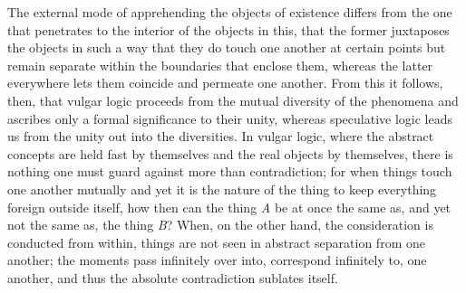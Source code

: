 \documentclass[12pt]{book}
\newcommand{\opage}[1]{\marginnote{\footnotesize\textit{[#1]}}}
\begin{document}
The external mode of apprehending the objects of existence differs from the one
that penetrates to the interior of the objects in this, that the former
juxtaposes the objects in
\opage{28} such a way that they do touch one another at certain points but remain separate
within the boundaries that enclose them, whereas the latter everywhere lets them
coincide and permeate one another. From this it follows, then, that vulgar logic
proceeds from the mutual diversity of the phenomena and ascribes only a formal
significance to their unity, whereas speculative logic leads us from the unity
out into the diversities. In vulgar logic, where the abstract concepts are held
fast by themselves and the real objects by themselves, there is nothing one
must guard against more than contradiction; for when things touch one another
mutually and yet it is the nature of the thing to keep everything foreign
outside itself, how then can the thing \textit{A} be at once the same as, and
yet not the same as, the thing \textit{B}? When, on the other hand, the
consideration is conducted from within, things are not seen in abstract
separation from one another; the moments pass infinitely over into, correspond
infinitely to, one another, and thus the absolute contradiction sublates
itself.
\end{document}
